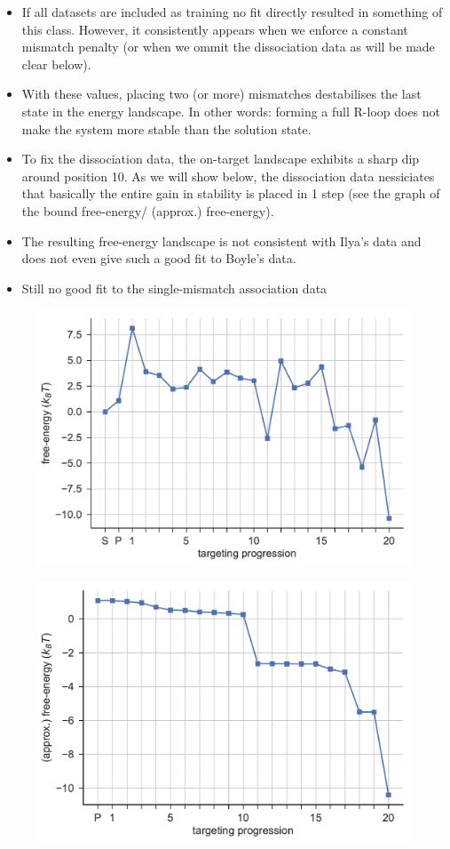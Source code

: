 \documentclass[a4paper,twoside]{revtex4-1}
\begin{document}
\begin{itemize}
\item If all datasets are included as training no fit directly resulted in something of this class. However, it consistently appears when we enforce a constant mismatch penalty (or when we ommit the dissociation data as will be made clear below). 
\item With these values, placing two (or more) mismatches destabilises the last state in the energy landscape. In other words: forming a full R-loop does not make the system more stable than the solution state.
\item  To fix the dissociation data, the on-target landscape exhibits a sharp dip around position 10. As we will show below, the dissociation data nessiciates that basically the entire gain in stability is placed in 1 step (see the graph of the bound free-energy/ (approx.) free-energy). 
\item The resulting free-energy landscape is not consistent with Ilya's data and does not even give such a good fit to Boyle's data.  
\item Still no good fit to the single-mismatch association data
\end{itemize}
\begin{figure}[H]
\includegraphics[scale=0.5]{fig32_10_10_2018.pdf}
\end{figure}


\begin{figure}[H]
\includegraphics[scale=0.5]{fig40_10_10_2018.pdf}
\end{figure}
\end{document}
